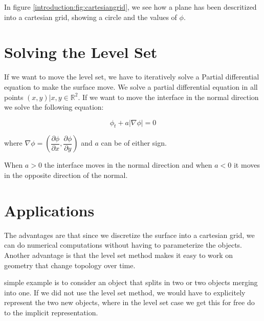 In figure \vref{introduction:fig:cartesiangrid}, we see how a plane
has been descritized into a cartesian grid, showing a circle and the
values of $\phi$.

\pagebreak


\section{Solving the Level Set}\label{sec:intro:solve} 


If we want to move the level set, we have to iteratively solve a
Partial differential equation to make the surface move. We solve a
partial differential equation in all points $(x,y) | x,y \in
\mathbb{R}^{2}$. If we want to move the interface in the normal
direction we solve the following equation:

\begin{equation}
\phi_{t} + a|\nabla \phi| = 0
\end{equation}\label{eq:normMove}

where $\nabla \phi = \left(\dfrac{\partial \phi}{\partial x},
\dfrac{\partial \phi}{\partial y}\right)$ and $a$ can be of either sign.

When $a > 0$ the interface moves in the normal direction and when $a <
0$ it moves in the opposite direction of the normal.

\section{Applications}

The advantages are that since we discretize the surface into a
cartesian grid, we can do numerical computations without having to
parameterize the objects. Another advantage is that the level set
method makes it easy to work on geometry that change topology over
time.


simple example is to consider an object that splits in two or two
objects merging into one. If we did not use the level set method, we
would have to explicitely represent the two new objects, where in the
level set case we get this for free do to the implicit representation.





